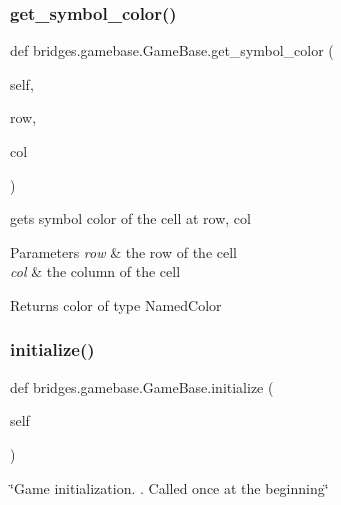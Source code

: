 \subsubsection{\texorpdfstring{get\+\_\+symbol\+\_\+color()}{get\_symbol\_color()}}
{\footnotesize\ttfamily def bridges.\+gamebase.\+Game\+Base.\+get\+\_\+symbol\+\_\+color (\begin{DoxyParamCaption}\item[{}]{self,  }\item[{}]{row,  }\item[{}]{col }\end{DoxyParamCaption})}



gets symbol color of the cell at row, col 


\begin{DoxyParams}{Parameters}
{\em row} & the row of the cell \\
\hline
{\em col} & the column of the cell\\
\hline
\end{DoxyParams}
\begin{DoxyReturn}{Returns}
color of type Named\+Color 
\end{DoxyReturn}
\mbox{\label{classbridges_1_1gamebase_1_1_game_base_a336629d190f1601f1211ca57e4d5427d}} 
\subsubsection{\texorpdfstring{initialize()}{initialize()}}
{\footnotesize\ttfamily def bridges.\+gamebase.\+Game\+Base.\+initialize (\begin{DoxyParamCaption}\item[{}]{self }\end{DoxyParamCaption})}



\char`\"{}\+Game initialization. . Called once at the beginning\char`\"{} 

\mbox{\label{classbridges_1_1gamebase_1_1_game_base_a21742d4e630fa64dc76848c7b4fcb344}} 
